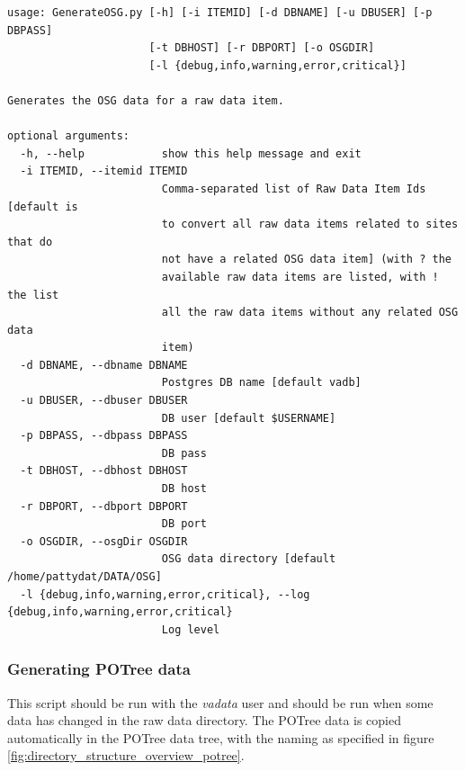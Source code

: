 \begin{Verbatim}[fontfamily=courier,commandchars=\\\{\},fontsize=\footnotesize]
 usage: GenerateOSG.py [-h] [-i ITEMID] [-d DBNAME] [-u DBUSER] [-p DBPASS]
                      [-t DBHOST] [-r DBPORT] [-o OSGDIR]
                      [-l {debug,info,warning,error,critical}]

Generates the OSG data for a raw data item.

optional arguments:
  -h, --help            show this help message and exit
  -i ITEMID, --itemid ITEMID
                        Comma-separated list of Raw Data Item Ids [default is
                        to convert all raw data items related to sites that do
                        not have a related OSG data item] (with ? the
                        available raw data items are listed, with ! the list
                        all the raw data items without any related OSG data
                        item)
  -d DBNAME, --dbname DBNAME
                        Postgres DB name [default vadb]
  -u DBUSER, --dbuser DBUSER
                        DB user [default $USERNAME]
  -p DBPASS, --dbpass DBPASS
                        DB pass
  -t DBHOST, --dbhost DBHOST
                        DB host
  -r DBPORT, --dbport DBPORT
                        DB port
  -o OSGDIR, --osgDir OSGDIR
                        OSG data directory [default /home/pattydat/DATA/OSG]
  -l {debug,info,warning,error,critical}, --log {debug,info,warning,error,critical}
                        Log level
\end{Verbatim}

\subsubsection{Generating POTree data}
\label{sec:generatePOTree}
 This script should be run with the \textit{vadata} user and should be run when some data has changed in the raw data directory. The POTree data is copied automatically in the POTree data tree, with the naming as specified in figure \ref{fig:directory_structure_overview_potree}.

